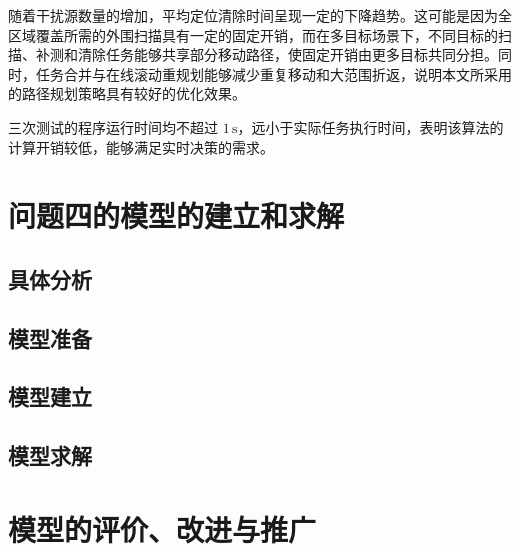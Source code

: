 \documentclass[withoutpreface,bwprint]{cumcmthesis}
\begin{document}
随着干扰源数量的增加，平均定位清除时间呈现一定的下降趋势。这可能是因为全区域覆盖所需的外围扫描具有一定的固定开销，而在多目标场景下，不同目标的扫描、补测和清除任务能够共享部分移动路径，使固定开销由更多目标共同分担。同时，任务合并与在线滚动重规划能够减少重复移动和大范围折返，说明本文所采用的路径规划策略具有较好的优化效果。

三次测试的程序运行时间均不超过 $1\,\mathrm{s}$，远小于实际任务执行时间，表明该算法的计算开销较低，能够满足实时决策的需求。













\newpage
\section{问题四的模型的建立和求解}
\subsection{具体分析}

\subsection{模型准备}

\subsection{模型建立}

\subsection{模型求解}



























\newpage
\section{模型的评价、改进与推广}
\end{document}
